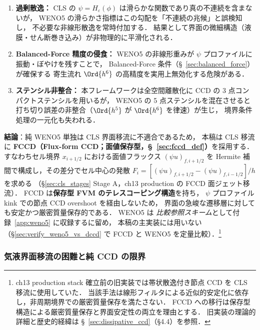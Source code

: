 \begin{enumerate}
  \item \textbf{過剰散逸：}
        CLS の $\psi = H_\varepsilon(\phi)$ は滑らかな関数であり真の不連続を含まないが，
        WENO5 の滑らかさ指標はこの勾配を「不連続の兆候」と誤検知し，
        不必要な非線形散逸を常時付加する．
        結果として界面の微細構造（液膜・せん断巻き込み）が非物理的に平滑化される．

  \item \textbf{Balanced-Force 精度の侵食：}
        WENO5 の非線形重みが $\psi$ プロファイルに振動・ぼやけを残すことで，
        Balanced-Force 条件（§~\ref{sec:balanced_force}）が確保する
        寄生流れ $\Ord{h^6}$ の高精度を実用上無効化する危険がある．

  \item \textbf{ステンシル非整合：}
        本フレームワークは全空間離散化に CCD の 3 点コンパクトステンシルを用いるが，
        WENO5 の 5 点ステンシルを混在させると
        打ち切り誤差の非整合（$\Ord{h^5}$ が $\Ord{h^6}$ を律速）が生じ，
        境界条件処理の一元化も失われる．
\end{enumerate}

\noindent
\textbf{結論}：純 WENO5 単独は CLS 界面移流に不適合であるため，
本稿は CLS 移流に \textbf{FCCD（Flux-form CCD；面値保存型，§~\ref{sec:fccd_def}）}を採用する．
すなわちセル境界 $x_{i+1/2}$ における面値フラックス $(\psi u)_{f,i+1/2}$ を
Hermite 補間で構成し，その差分でセル中心の発散
$F_i = [(\psi u)_{f,i+1/2} - (\psi u)_{f,i-1/2}]/h$ を求める
（§\ref{sec:cls_stages} Stage A，ch13 production の FCCD 面ジェット移流）．
FCCD は\textbf{保存型 FVM のテレスコーピング構造}を持ち，
$\psi$ プロファイル kink での節点 CCD overshoot を経由しないため，
界面の急峻な遷移層に対しても安定かつ厳密質量保存的である．
WENO5 は \emph{比較参照スキーム}として付録~\ref{app:weno5} に収録するに留め，
本稿の主実装には用いない（§\ref{sec:verify_weno5_vs_dccd} で FCCD と WENO5 を定量比較）．\footnote{ch13
production stack 確立前の旧実装では帯状散逸付き節点 CCD を CLS 移流に使用していた．
当該手法は線形フィルタによる近似的安定化に依存し，非周期境界での厳密質量保存を満たさない．
FCCD への移行は保存型構造による厳密質量保存と界面安定性の両立を理由とする．
旧実装の理論的詳細と歴史的経緯は §~\ref{sec:dissipative_ccd}（§4.4）を参照．}

\subsubsection{気液界面移流の困難と純 CCD の限界}
\label{sec:advection_ccd_limit}

